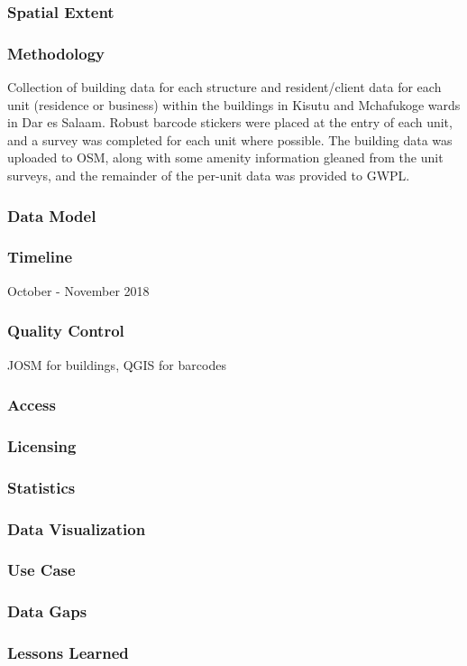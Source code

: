 \documentclass[a4paper,12pt,twoside]{article}
\begin{document}
\subsubsection{Spatial Extent}
\subsubsection{Methodology}
Collection of building data for each structure and resident/client data for each unit (residence or business) within the buildings in Kisutu and Mchafukoge wards in Dar es Salaam. Robust barcode stickers were placed at the entry of each unit, and a survey was completed for each unit where possible. The building data was uploaded to OSM, along with some amenity information gleaned from the unit surveys, and the remainder of the per-unit data was provided to GWPL.
\subsubsection{Data Model}
\subsubsection{Timeline}
October - November 2018
\subsubsection{Quality Control}
JOSM for buildings, QGIS for barcodes
\subsubsection{Access}
\subsubsection{Licensing}
\subsubsection{Statistics}
\subsubsection{Data Visualization}
\subsubsection{Use Case}
\subsubsection{Data Gaps}
\subsubsection{Lessons Learned}
\end{document}
